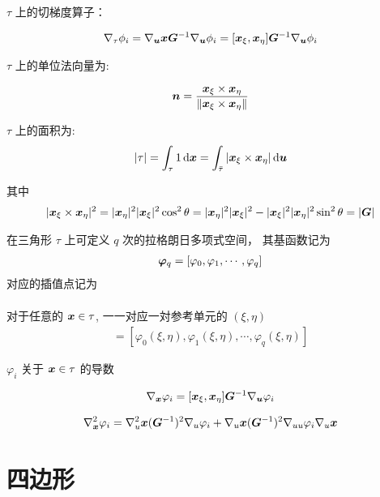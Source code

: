 \documentclass{article}
\begin{document}
$\tau$ 上的切梯度算子：

\begin{align*}
    \nabla_\tau \phi_i = 
    \nabla_{\boldsymbol u} {\boldsymbol x} {\boldsymbol G}^{-1} \nabla_{\boldsymbol u} \phi_i =
    [{\boldsymbol x}_\xi, {\boldsymbol x}_\eta] {\boldsymbol G}^{-1} \nabla_{\boldsymbol u} \phi_i
\end{align*}

$\tau$ 上的单位法向量为:

$$
{\boldsymbol n} = \frac{{\boldsymbol x}_{\xi} \times {\boldsymbol x}_{\eta}}{\|{\boldsymbol x}_{\xi} \times {\boldsymbol x}_{\eta}\|}
$$

$\tau$ 上的面积为:
\begin{align*}
    |\tau| = \int_\tau 1 \,\mathrm d{\boldsymbol x} = \int_{\bar\tau} |{\boldsymbol x}_\xi \times {\boldsymbol x}_\eta| \,\mathrm d{\boldsymbol u}
\end{align*}

其中
\begin{align*}
|{\boldsymbol x}_\xi \times {\boldsymbol x}_\eta|^2 = |{\boldsymbol x}_\eta|^2 |{\boldsymbol x}_\xi|^2 \cos^2 \theta  = |{\boldsymbol x}_\eta|^2 |{\boldsymbol x}_\xi|^2 -|{\boldsymbol x}_\xi|^2 |{\boldsymbol x}_{\eta}|^2 
\sin^2 \theta = | {\boldsymbol G} |
\end{align*}

在三角形 $\tau$ 上可定义 $q$ 次的拉格朗日多项式空间， 其基函数记为
\begin{align*}
    {\bm \varphi}_q = [\varphi_0, \varphi_1, \cdots, \varphi_q]
\end{align*}
对应的插值点记为
\begin{align*}
    [\bfy_0, \bfy_1, \cdots, \bfy_q]
\end{align*}

对于任意的 ${\boldsymbol x} \in \tau$, 一一对应一対参考单元的 $(\xi , \eta) $
\begin{align*}
    [\varphi_0(\bfx), \varphi_1(\bfx), \cdots, \varphi_q(\bfx)] = 
    [\varphi_0(\xi,\eta), \varphi_1(\xi,\eta), \cdots, \varphi_q(\xi,\eta)] 
\end{align*}

 $\varphi_i$ 关于 ${\boldsymbol x} \in \tau$ 的导数

\begin{align*}
    \nabla_{\boldsymbol x} \varphi_i = [{\boldsymbol x}_\xi, {\boldsymbol x}_\eta] {\boldsymbol G}^{-1} \nabla_{\boldsymbol u} \varphi_i
\end{align*}

\begin{align*}
    \nabla^2_{\boldsymbol x} \varphi_i = \nabla^2_u {\boldsymbol x} ({\boldsymbol G}^{-1})^2 \nabla_u \varphi_i + \nabla_u {\boldsymbol x} ({\boldsymbol G}^{-1})^2 \nabla_{uu}\varphi_i \nabla_u {\boldsymbol x}
\end{align*}

\section{四边形}
\end{document}
